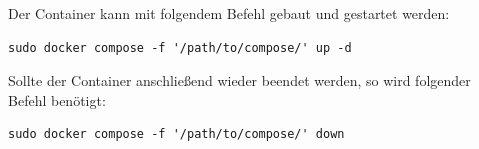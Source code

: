 Der Container kann mit folgendem Befehl gebaut und gestartet werden:
\begin{lstlisting}[caption={Starten eines Docker-Containers}]
sudo docker compose -f '/path/to/compose/' up -d
\end{lstlisting}

Sollte der Container anschließend wieder beendet werden, so wird folgender Befehl benötigt: 
\begin{lstlisting}[caption={Beenden eines Docker-Containers}]
sudo docker compose -f '/path/to/compose/' down
\end{lstlisting}